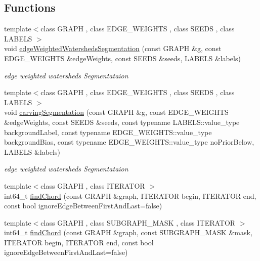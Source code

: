 \subsection*{Functions}
\begin{DoxyCompactItemize}
\item 
{\footnotesize template$<$class G\+R\+A\+P\+H , class E\+D\+G\+E\+\_\+\+W\+E\+I\+G\+H\+T\+S , class S\+E\+E\+D\+S , class L\+A\+B\+E\+L\+S $>$ }\\void \hyperlink{namespacenifty_1_1graph_a3e294171c18ca5e524f85c9341ef2f5e}{edge\+Weighted\+Watersheds\+Segmentation} (const G\+R\+A\+P\+H \&g, const E\+D\+G\+E\+\_\+\+W\+E\+I\+G\+H\+T\+S \&edge\+Weights, const S\+E\+E\+D\+S \&seeds, L\+A\+B\+E\+L\+S \&labels)
\begin{DoxyCompactList}\small\item\em edge weighted watersheds Segmentataion \end{DoxyCompactList}\item 
{\footnotesize template$<$class G\+R\+A\+P\+H , class E\+D\+G\+E\+\_\+\+W\+E\+I\+G\+H\+T\+S , class S\+E\+E\+D\+S , class L\+A\+B\+E\+L\+S $>$ }\\void \hyperlink{namespacenifty_1_1graph_a428250605a1a1f6fc93fd6aac965b931}{carving\+Segmentation} (const G\+R\+A\+P\+H \&g, const E\+D\+G\+E\+\_\+\+W\+E\+I\+G\+H\+T\+S \&edge\+Weights, const S\+E\+E\+D\+S \&seeds, const typename L\+A\+B\+E\+L\+S\+::value\+\_\+type background\+Label, const typename E\+D\+G\+E\+\_\+\+W\+E\+I\+G\+H\+T\+S\+::value\+\_\+type background\+Bias, const typename E\+D\+G\+E\+\_\+\+W\+E\+I\+G\+H\+T\+S\+::value\+\_\+type no\+Prior\+Below, L\+A\+B\+E\+L\+S \&labels)
\begin{DoxyCompactList}\small\item\em edge weighted watersheds Segmentataion \end{DoxyCompactList}\item 
{\footnotesize template$<$class G\+R\+A\+P\+H , class I\+T\+E\+R\+A\+T\+O\+R $>$ }\\int64\+\_\+t \hyperlink{namespacenifty_1_1graph_a5efcd6025d7a1aa6ec3e9826f05d73f1}{find\+Chord} (const G\+R\+A\+P\+H \&graph, I\+T\+E\+R\+A\+T\+O\+R begin, I\+T\+E\+R\+A\+T\+O\+R end, const bool ignore\+Edge\+Between\+First\+And\+Last=false)
\item 
{\footnotesize template$<$class G\+R\+A\+P\+H , class S\+U\+B\+G\+R\+A\+P\+H\+\_\+\+M\+A\+S\+K , class I\+T\+E\+R\+A\+T\+O\+R $>$ }\\int64\+\_\+t \hyperlink{namespacenifty_1_1graph_aa3515c9d13aba223fd3f7771db67af53}{find\+Chord} (const G\+R\+A\+P\+H \&graph, const S\+U\+B\+G\+R\+A\+P\+H\+\_\+\+M\+A\+S\+K \&mask, I\+T\+E\+R\+A\+T\+O\+R begin, I\+T\+E\+R\+A\+T\+O\+R end, const bool ignore\+Edge\+Between\+First\+And\+Last=false)

\end{DoxyCompactItemize}
